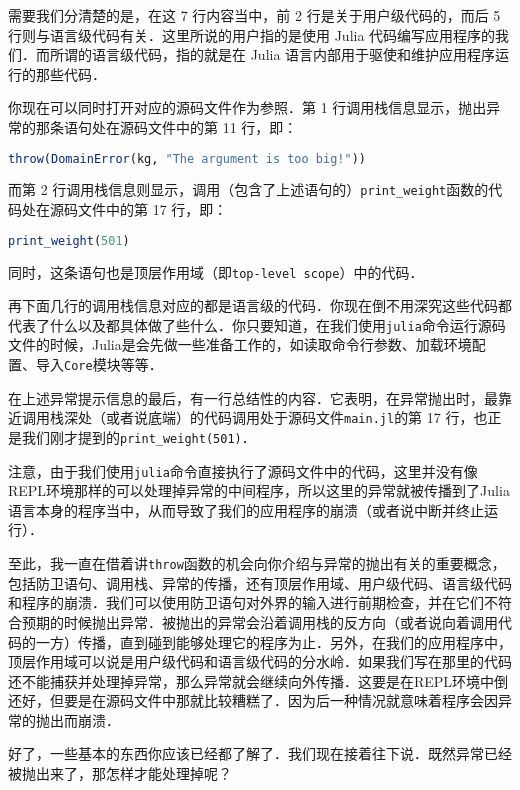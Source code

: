 需要我们分清楚的是，在这 7 行内容当中，前 2 行是关于用户级代码的，而后 5 行则与语言级代码有关．这里所说的用户指的是使用 Julia 代码编写应用程序的我们．而所谓的语言级代码，指的就是在 Julia 语言内部用于驱使和维护应用程序运行的那些代码．

你现在可以同时打开对应的源码文件作为参照．第 1 行调用栈信息显示，抛出异常的那条语句处在源码文件中的第 11 行，即：

\begin{lstlisting}[language=julia]
throw(DomainError(kg, "The argument is too big!"))
\end{lstlisting}

而第 2 行调用栈信息则显示，调用（包含了上述语句的）\verb|print_weight|函数的代码处在源码文件中的第 17 行，即：

\begin{lstlisting}[language=julia]
print_weight(501)
\end{lstlisting}

同时，这条语句也是顶层作用域（即\verb|top-level scope|）中的代码．

再下面几行的调用栈信息对应的都是语言级的代码．你现在倒不用深究这些代码都代表了什么以及都具体做了些什么．你只要知道，在我们使用\verb|julia|命令运行源码文件的时候，Julia是会先做一些准备工作的，如读取命令行参数、加载环境配置、导入\verb|Core|模块等等． 

在上述异常提示信息的最后，有一行总结性的内容．它表明，在异常抛出时，最靠近调用栈深处（或者说底端）的代码调用处于源码文件\verb|main.jl|的第 17 行，也正是我们刚才提到的\verb|print_weight(501)|．

注意，由于我们使用\verb|julia|命令直接执行了源码文件中的代码，这里并没有像REPL环境那样的可以处理掉异常的中间程序，所以这里的异常就被传播到了Julia语言本身的程序当中，从而导致了我们的应用程序的崩溃（或者说中断并终止运行）．

至此，我一直在借着讲\verb|throw|函数的机会向你介绍与异常的抛出有关的重要概念，包括防卫语句、调用栈、异常的传播，还有顶层作用域、用户级代码、语言级代码和程序的崩溃．我们可以使用防卫语句对外界的输入进行前期检查，并在它们不符合预期的时候抛出异常．被抛出的异常会沿着调用栈的反方向（或者说向着调用代码的一方）传播，直到碰到能够处理它的程序为止．另外，在我们的应用程序中，顶层作用域可以说是用户级代码和语言级代码的分水岭．如果我们写在那里的代码还不能捕获并处理掉异常，那么异常就会继续向外传播．这要是在REPL环境中倒还好，但要是在源码文件中那就比较糟糕了．因为后一种情况就意味着程序会因异常的抛出而崩溃．

好了，一些基本的东西你应该已经都了解了．我们现在接着往下说．既然异常已经被抛出来了，那怎样才能处理掉呢？

